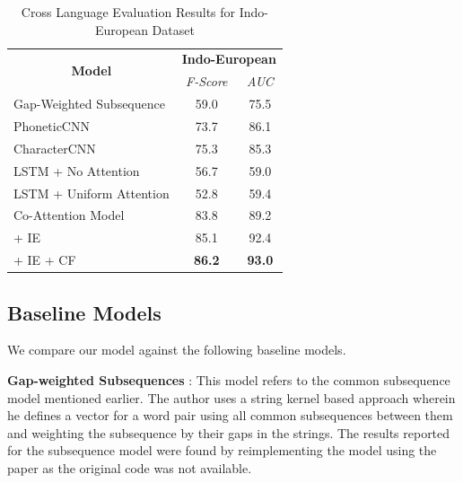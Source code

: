 \documentclass[11pt,letterpaper]{article}
\begin{document}
\begin{table}[t]
\centering

\begin{tabular}{lcc}
\multicolumn{1}{c}{\multirow{2}{*}{\textbf{Model}}} & \multicolumn{2}{c}{\textbf{Indo-European}} \\ \cline{2-3} 
\multicolumn{1}{c}{}                                & \textit{F-Score}      & \textit{AUC}       \\ \hline
Gap-Weighted Subsequence                            & 59.0                  & 75.5               \\
PhoneticCNN                                         & 73.7                  & 86.1               \\
CharacterCNN                                        & 75.3                  & 85.3               \\
LSTM + No Attention                                 & 56.7                  & 59.0               \\
LSTM + Uniform Attention                            & 52.8                  & 59.4               \\ \hline
Co-Attention Model                                  & 83.8                  & 89.2               \\
\quad + IE                                          & 85.1                  & 92.4               \\
\quad + IE + CF                                     & \textbf{86.2}         & \textbf{93.0}     
\end{tabular}

\label{CL_res}
\caption{Cross Language Evaluation Results for Indo-European Dataset }
\end{table}
\subsection{Baseline Models}

We compare our model against the following baseline models. 

\textbf{Gap-weighted Subsequences} : This model refers to the common subsequence model \cite{rama2015automatic} mentioned earlier. The author uses a string kernel based approach wherein he defines a vector for a word pair using all common subsequences between them and weighting the subsequence by their gaps in the strings. The results reported for the subsequence model were found by reimplementing the model using the paper as the original code was not available.
\end{document}
